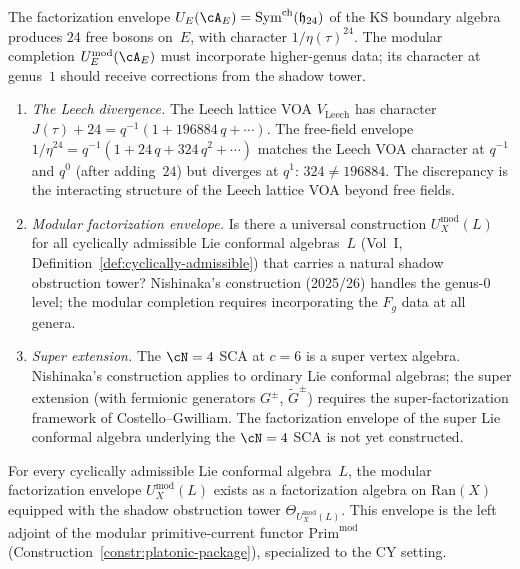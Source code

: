 \begin{openproblem}
\label{op:programme-f-factorization-envelope}
The factorization envelope $U_E(\cA_E) =
\mathrm{Sym}^{\mathrm{ch}}(\mathfrak{h}_{24})$ of the
KS boundary algebra produces $24$ free bosons on~$E$,
with character $1/\eta(\tau)^{24}$. The modular
completion $U_E^{\mathrm{mod}}(\cA_E)$ must incorporate
higher-genus data; its character at genus~$1$ should
receive corrections from the shadow tower.
\begin{enumerate}[label=\textup{(\roman*)}]
\item \emph{The Leech divergence.} The Leech lattice
 VOA $V_{\mathrm{Leech}}$ has character
 $J(\tau) + 24 = q^{-1}(1 + 196884\,q + \cdots)$.
 The free-field envelope $1/\eta^{24}
 = q^{-1}(1 + 24\,q + 324\,q^2 + \cdots)$ matches
 the Leech VOA character at $q^{-1}$ and $q^0$
 (after adding~$24$) but diverges at $q^1$:
 $324 \neq 196884$. The discrepancy is the interacting
 structure of the Leech lattice VOA beyond free fields.
\item \emph{Modular factorization envelope.} Is there a
 universal construction
 $U_X^{\mathrm{mod}}(L)$ for all cyclically admissible
 Lie conformal algebras~$L$
 (Vol~I, Definition~\ref{def:cyclically-admissible}) that
 carries a natural shadow obstruction tower? Nishinaka's
 construction (2025/26) handles the genus-$0$ level;
 the modular completion requires incorporating the
 $F_g$ data at all genera.
\item \emph{Super extension.} The $\cN = 4$ SCA at
 $c = 6$ is a super vertex algebra. Nishinaka's
 construction applies to ordinary Lie conformal algebras;
 the super extension (with fermionic generators $G^\pm$,
 $\widetilde{G}^\pm$) requires the super-factorization
 framework of Costello--Gwilliam. The factorization
 envelope of the super Lie conformal algebra underlying
 the $\cN = 4$ SCA is not yet constructed.
\end{enumerate}
\end{openproblem}

\begin{conjecture}
\label{conj:modular-fact-envelope}
\ClaimStatusConjectured
{}
For every cyclically admissible Lie conformal algebra~$L$,
the modular factorization envelope
$U_X^{\mathrm{mod}}(L)$ exists as a factorization algebra
on $\mathrm{Ran}(X)$ equipped with the shadow obstruction
tower $\Theta_{U_X^{\mathrm{mod}}(L)}$. This envelope
is the left adjoint of the modular primitive-current functor
$\mathrm{Prim}^{\mathrm{mod}}$
\textup{(}Construction~\textup{\ref{constr:platonic-package})},
specialized to the CY setting.
\end{conjecture}

